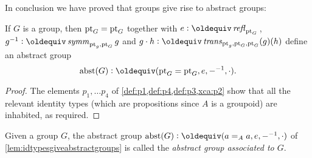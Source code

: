 In conclusion we have proved that groups give rise to abstract groups:
  \begin{lemma}\label{lem:idtypesgiveabstractgroups}
    If $G$ is a group, then ${\mathord{\mathrm{pt}}}_G={\mathord{\mathrm{pt}}}_G$ together with $e\defequi\refl{\pt_G}{}$, $g^{-1}\defequi\symm_{\pt_g,\pt_G}g$ and $g\cdot h\defequi\trans_{\pt_g,\pt_G,\pt_G}(g)(h)$
define an abstract group
$$\abstr(G)\defequi (\pt_G=\pt_G,e,{-}^{-1},\cdot).$$
  \end{lemma}
  \begin{proof}
    The elements $p_1,\dots p_4$ of \cref{def:p1,def:p4,def:p3,xca:p2} show that all the relevant identity types (which are propositions since $A$ is a groupoid) are inhabited, as required.
  \end{proof}
  \begin{definition}\label{def:abstrG}
    Given a group $G$, the abstract group $\abstr(G)\defequi (a=_Aa,e,{-}^{-1},\cdot)$ of \cref{lem:idtypesgiveabstractgroups} is called the \emph{abstract group associated to $G$}.
  \end{definition}

